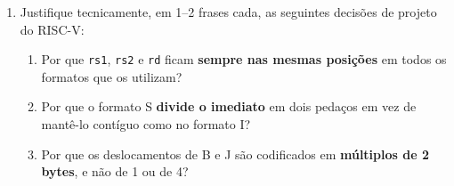 \documentclass[11pt, a4paper]{article}
\begin{document}
\begin{enumerate}
\item Justifique tecnicamente, em 1--2 frases cada, as seguintes decis\~{o}es de projeto do RISC-V:
\begin{enumerate}
  \item Por que \texttt{rs1}, \texttt{rs2} e \texttt{rd} ficam \textbf{sempre nas mesmas posi\c{c}\~{o}es} em todos os formatos que os utilizam?
  \item Por que o formato S \textbf{divide o imediato} em dois peda\c{c}os em vez de mant\^{e}-lo cont\'{i}guo como no formato I?
  \item Por que os deslocamentos de B e J s\~{a}o codificados em \textbf{m\'{u}ltiplos de 2 bytes}, e n\~{a}o de 1 ou de 4?
\end{enumerate}

\end{enumerate}
\end{document}
